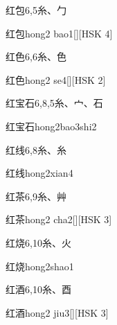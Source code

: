 \begin{Entry}{红包}{6,5}{⽷、⼓}
  \begin{Phonetics}{红包}{hong2 bao1}[][HSK 4]
  \end{Phonetics}
\end{Entry}

\begin{Entry}{红色}{6,6}{⽷、⾊}
  \begin{Phonetics}{红色}{hong2 se4}[][HSK 2]
  \end{Phonetics}
\end{Entry}

\begin{Entry}{红宝石}{6,8,5}{⽷、⼧、⽯}
  \begin{Phonetics}{红宝石}{hong2bao3shi2}
  \end{Phonetics}
\end{Entry}

\begin{Entry}{红线}{6,8}{⽷、⽷}
  \begin{Phonetics}{红线}{hong2xian4}
  \end{Phonetics}
\end{Entry}

\begin{Entry}{红茶}{6,9}{⽷、⾋}
  \begin{Phonetics}{红茶}{hong2 cha2}[][HSK 3]
  \end{Phonetics}
\end{Entry}

\begin{Entry}{红烧}{6,10}{⽷、⽕}
  \begin{Phonetics}{红烧}{hong2shao1}
  \end{Phonetics}
\end{Entry}

\begin{Entry}{红酒}{6,10}{⽷、⾣}
  \begin{Phonetics}{红酒}{hong2 jiu3}[][HSK 3]
  \end{Phonetics}
\end{Entry}

